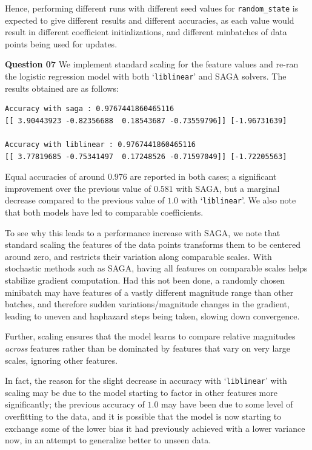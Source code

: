 \documentclass{article}[a4paper]
\begin{document}
	Hence, performing different runs with different seed values for \texttt{random\_state} is expected to give different results and different accuracies, as each value would result in different coefficient initializations, and different minbatches of data points being used for updates.
	\medskip

	\textbf{Question 07} We implement standard scaling for the feature values and re-ran the logistic regression model with both `\texttt{liblinear}' and SAGA solvers. The results obtained are as follows:
	\begin{verbatim}
Accuracy with saga : 0.9767441860465116
[[ 3.90443923 -0.82356688  0.18543687 -0.73559796]] [-1.96731639]

Accuracy with liblinear : 0.9767441860465116
[[ 3.77819685 -0.75341497  0.17248526 -0.71597049]] [-1.72205563]
\end{verbatim}
	Equal accuracies of around $0.976$ are reported in both cases; a significant improvement over the previous value of $0.581$ with SAGA, but a marginal decrease compared to the previous value of $1.0$ with `\texttt{liblinear}'. We also note that both models have led to comparable coefficients.

	To see why this leads to a performance increase with SAGA, we note that standard scaling the features of the data points transforms them to be centered around zero, and restricts their variation along comparable scales. With stochastic methods such as SAGA, having all features on comparable scales helps stabilize gradient computation. Had this not been done, a randomly chosen minibatch may have features of a vastly different magnitude range than other batches, and therefore sudden variations/magnitude changes in the gradient, leading to uneven and haphazard steps being taken, slowing down convergence.

	Further, scaling ensures that the model learns to compare relative magnitudes \textit{across} features rather than be dominated by features that vary on very large scales, ignoring other features.

	In fact, the reason for the slight decrease in accuracy with `\texttt{liblinear}' with scaling may be due to the model starting to factor in other features more significantly; the previous accuracy of $1.0$ may have been due to some level of overfitting to the data, and it is possible that the model is now starting to exchange some of the lower bias it had previously achieved with a lower variance now, in an attempt to generalize better to unseen data.
	\medskip
\end{document}

